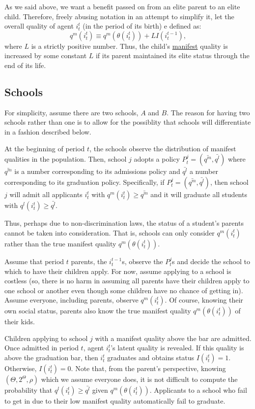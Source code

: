 \documentclass[
12pt,
titlepage,
reqno,
]{article}%
\begin{document}
	As we said above, we want a benefit passed on from an elite parent to an elite child.
	Therefore, freely abusing notation in an attempt to simplify it, let the overall quality of agent $i^t_t$ (in the period of its birth) e defined as:
	 \[
	 q^m(i^t_t)\equiv q^m(\theta(i^t_t)) + LI(i^{t-1}_{t}),
	 \]
	where $L$ is a strictly positive number.
	Thus, the child's \underline{manifest} quality is increased by some constant $L$ if its parent maintained its elite status through the end of its life. 
	
	
\subsection{Schools}
For simplicity, assume there are two schools, $A$ and $B$. 
The reason for having two schools rather than one is to allow for the possiblity that schools will differentiate in a fashion described below. 

At the beginning of period $t$, the schools observe the distribution of manifest qualities in the population. 
Then, school $j$ adopts a policy $P^j_t=(\bar{q^m},\bar{q^l})$ where $\bar{q^m}$ is a number corresponding to its admissions policy and $\bar{q^l}$ a number corresponding to its graduation policy.
Specifically, if $P^j_t=(\bar{q^m},\bar{q^l})$, then school $j$ will admit all applicants $i^t_t$ with  $q^m(i^t_t)\ge\bar{q^m}$ and it will graduate all students with  $q^l(i^t_t)\ge\bar{q^l}$.


Thus, perhaps due to non-discrimination laws, the status of a student's parents cannot be taken into consideration.
That is, schools can only consider $q^m(i^t_t)$ rather than the true manifest quality $q^m(\theta(i^t_t))$.

Assume that period $t$ parents, the $i^{t-1}_{t}$s, observe the $P^j_t$s and decide the school to which to have their children apply.
For now, assume applying to a school is costless 
(so, there is no harm in assuming all parents have their children apply to one school or another even though some children have no chance of getting in). 
Assume everyone, including parents, observe $ q^m(i^t_t)$. 
Of course, knowing their own social status, parents also know the true manifest quality $q^m(\theta(i^t_t))$ of their kids.

Children applying to school $j$ with a manifest quality above the bar are admitted.
Once admitted in period $t$, agent $i^t_t$'s latent quality is revealed. 
If this quality is above the graduation bar, then $i^t_t$ graduates and obtains status $I(i^t_t) =1$.
Otherwise, $I(i^t_t) =0$.
Note that, from the parent's perspective, knowing $(\Theta,2^\Theta,\rho)$ which we assume everyone does, it is not difficult to compute the probability that $q^l(i^t_t)\ge\bar{q^l}$ given $q^m(\theta(i^t_t))$.
Applicants to a school who fail to get in due to their low manifest quality automatically fail to graduate.
\end{document}
